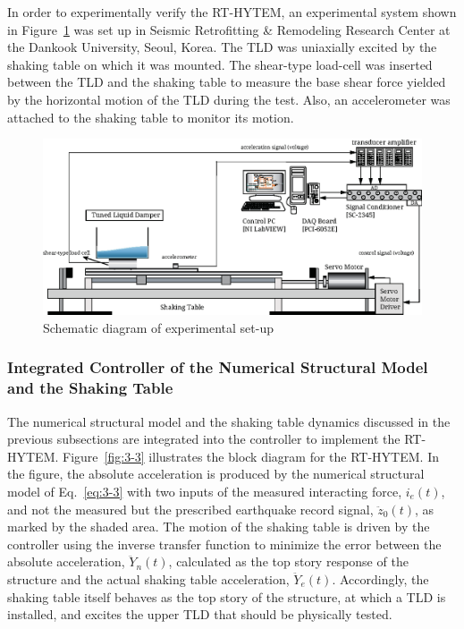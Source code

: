 In order to experimentally verify the RT-HYTEM, an experimental system shown in Figure~\ref{fig:3-2} was set up in Seismic Retrofitting \& Remodeling Research Center at the Dankook University, Seoul, Korea. The TLD was uniaxially excited by the shaking table on which it was mounted. The shear-type load-cell was inserted between the TLD and the shaking table to measure the base shear force yielded by the horizontal motion of the TLD during the test. Also, an accelerometer was attached to the shaking table to monitor its motion.

\begin{figure}[ht]
\centering
\includegraphics[scale =1] {figure/3-2.eps}
\caption{Schematic diagram of experimental set-up}
\label{fig:3-2}
\end{figure}

\subsubsection{Integrated Controller of the Numerical Structural Model and the Shaking Table}
The numerical structural model and the shaking table dynamics discussed in the previous subsections are integrated into the controller to implement the RT-HYTEM. Figure~\ref{fig:3-3} illustrates the block diagram for the RT-HYTEM. In the figure, the absolute acceleration is produced by the numerical structural model of Eq.~\eqref{eq:3-3} with two inputs of the measured interacting force, $i_{e}(t)$, and not the measured but the prescribed earthquake record signal, $\ddot{z}_{0}(t)$, as marked by the shaded area. The motion of the shaking table is driven by the controller using the inverse transfer function to minimize the error between the absolute acceleration, $\ddot{Y}_{n}(t)$, calculated as the top story response of the structure and the actual shaking table acceleration, $\ddot{Y}_{e}(t)$. Accordingly, the shaking table itself behaves as the top story of the structure, at which a TLD is installed, and excites the upper TLD that should be physically tested.

